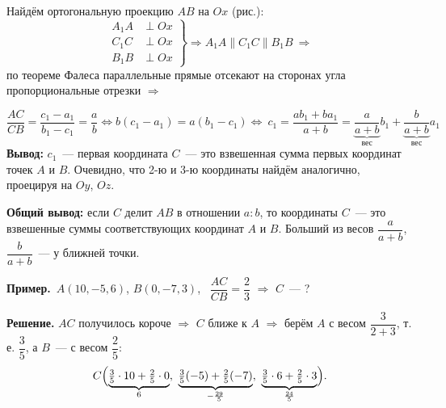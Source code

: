 \documentclass[a4paper,11pt]{article}
\newcommand{\prim}{\textbf{Пример.}\ }
\begin{document}
\begin{minipage}[c]{0.46\linewidth}
\centering
{}
\end{minipage}\hfill
\begin{minipage}[c]{0.52\linewidth}
Найдём ортогональную проекцию $AB$ на $Ox$ (рис.):
\[
\left.\begin{aligned}A_1A&\perp Ox\\C_1C&\perp Ox\\B_1B&\perp Ox\end{aligned}\right\}\Rightarrow
A_1A\parallel C_1C\parallel B_1B\ \Rightarrow
\]
по теореме Фалеса параллельные прямые отсекают на сторонах угла пропорциональные отрезки $\Rightarrow$
\end{minipage}
\[
\frac{AC}{CB}=\frac{c_1-a_1}{b_1-c_1}=\frac ab\iff b(c_1-a_1)=a(b_1-c_1)\iff
\boxed{\ c_1=\frac{ab_1+ba_1}{a+b}=\underbrace{\frac{a}{a+b}}_{\text{вес}}b_1+\underbrace{\frac{b}{a+b}}_{\text{вес}}a_1\ }
\]
\textbf{Вывод:} $c_1$~--- первая координата $C$~--- это взвешенная сумма первых координат точек $A$ и $B$.
Очевидно, что 2-ю и 3-ю координаты найдём аналогично, проецируя на $Oy$, $Oz$.

\textbf{Общий вывод:} если $C$ делит $AB$ в отношении $a:b$, то координаты $C$~--- это взвешенные суммы
соответствующих координат $A$ и $B$. Больший из весов $\dfrac a{a+b}$, $\dfrac b{a+b}$~--- у ближней точки.

\prim $A(10,-5,6)$, $B(0,-7,3)$, \ $\dfrac{AC}{CB}=\dfrac23$ $\Rightarrow$ $C$~--- ?

\textbf{Решение.} $AC$ получилось короче $\Rightarrow$ $C$ ближе к $A$ $\Rightarrow$ берём $A$ с весом
$\dfrac3{2+3}$, т.\,е. $\dfrac35$, а $B$~--- с весом $\dfrac25$:
\[
C\Bigl(\underbrace{\tfrac35\cdot10+\tfrac25\cdot0}_{6},\ \underbrace{\tfrac35(-5)+\tfrac25(-7)}_{-\frac{29}5},\
\underbrace{\tfrac35\cdot6+\tfrac25\cdot3}_{\frac{24}5}\Bigr).
\]
\end{document}
